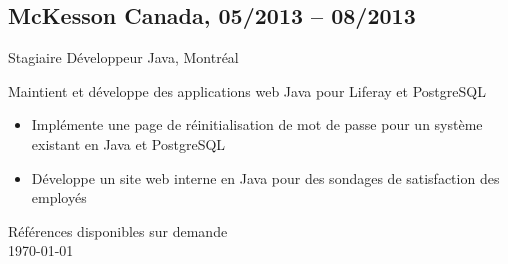 \documentclass{article}
\begin{document}
\begin{paracol}{2}
\begin{rightcolumn}
    \subsection{McKesson Canada, 05/2013 -- 08/2013}  
    {Stagiaire Développeur Java, Montréal\par}  
    {  
      Maintient et développe des applications web Java pour Liferay et PostgreSQL  
    \par}  
    \begin{itemize}  
      \item Implémente une page de réinitialisation de mot de passe pour un système existant en Java et PostgreSQL  
      \item Développe un site web interne en Java pour des sondages de satisfaction des employés  
    \end{itemize}  

    \vspace{1em}  

    Références disponibles sur demande \\  
    \today

    \flushpage

    \par\vfill

  \end{rightcolumn}
\end{paracol}
\end{document}
